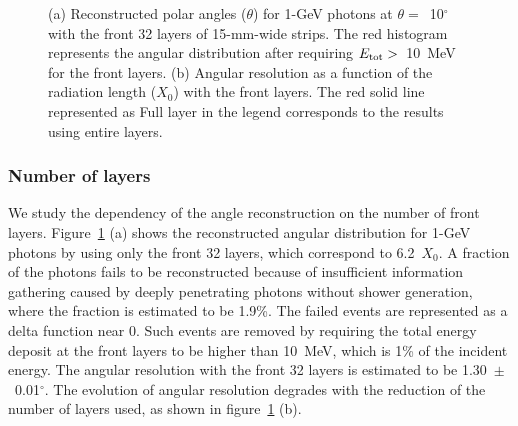 \documentclass[12pt,times,draftclsnofoot,a4paper]{elsarticle}
\begin{document}
\begin{figure}[!hbt]
\centering
{}
\caption{ (a) Reconstructed polar angles ($\theta$) for 1-GeV photons at $\theta=$~10$^{\circ}$  with the front 32 layers of 15-mm-wide strips. The red histogram represents the angular distribution after requiring $E_{\rm{tot}}>$~10~MeV for the front layers. (b) Angular resolution as a function of the radiation length ($X_{0}$) with the front layers. The red solid line represented as Full layer in the legend corresponds to the results using entire layers.}
\label{fig:angle_reco_layer}
\end{figure}

\subsubsection{Number of layers}
We study the dependency of the angle reconstruction on the number of front layers. Figure~\ref{fig:angle_reco_layer} (a) shows the reconstructed angular distribution for 1-GeV photons by using only the front 32 layers, which correspond to 6.2~$X_{0}$. A fraction of the photons fails to be reconstructed because of insufficient information gathering caused by deeply penetrating photons without shower generation, where the fraction is estimated to be 1.9\%. The failed events are represented as a delta function near 0. Such events are removed by requiring the total energy deposit at the front layers to be higher than 10~MeV, which is 1\% of the incident energy. The angular resolution with the front 32 layers is estimated to be 1.30~$\pm$~0.01$^{\circ}$. The evolution of angular resolution degrades with the reduction of the number of layers used, as shown in figure~\ref{fig:angle_reco_layer} (b).
\end{document}
